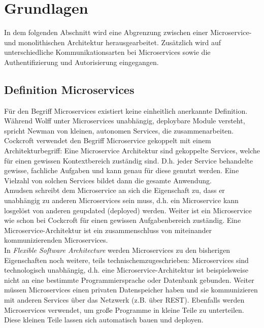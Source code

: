
\section{Grundlagen}

In dem folgenden Abschnitt wird eine Abgrenzung zwischen einer Microservice- und monolithischen Architektur herausgearbeitet. Zusätzlich wird auf unterschiedliche Kommunikationsarten bei Microservices sowie die Authentifizierung und Autorisierung eingegangen. 

\subsection{Definition Microservices}

Für den Begriff Microservices existiert keine einheitlich anerkannte Definition. Während Wolff unter Microservices unabhängig, deploybare Module versteht\cite{wolff2018mic_praxis}, spricht Newman von kleinen, autonomen Services, die zusammenarbeiten. Cockcroft verwendet den Begriff Microservice gekoppelt mit einem Architekturbegriff: Eine Microservice Architektur sind gekoppelte Services, welche für einen gewissen Kontextbereich zuständig sind.\cite{irakli2016mic_arc} D.h. jeder Service behandelte gewisse, fachliche Aufgaben und kann genau für diese genutzt werden. Eine Vielzahl von solchen Services bildet dann die gesamte Anwendung. \\

Amudsen schreibt dem Microservice an sich die Eigenschaft zu, dass er unabhängig zu anderen Microservices sein muss, d.h. ein Microservice kann losgelöst von anderen geupdated (deployed) werden. Weiter ist ein Microservice wie schon bei Cockcroft für einen gewissen Aufgabenbereich zuständig. Eine Microservice-Architektur ist ein zusammenschluss von miteinander kommunizierenden Microservices.\cite{irakli2016mic_arc} \\

In \textit{Flexible Software Architecture}\cite{wolff2016mic_architectures} werden Microservices zu den bisherigen Eigenschaften noch weitere, teils technischemzugeschrieben: Microservices sind technologisch unabhängig, d.h. eine Microservice-Architektur ist beispielsweise nicht an eine bestimmte Programmiersprache oder Datenbank gebunden. Weiter müssen Microservices einen privaten Datenspeicher haben und sie kommunizieren mit anderen Services über das Netzwerk (z.B. über REST). Ebenfalls werden Microservices verwendet, um große Programme in kleine Teile zu unterteilen. Diese kleinen Teile lassen sich automatisch bauen und deployen. \\

